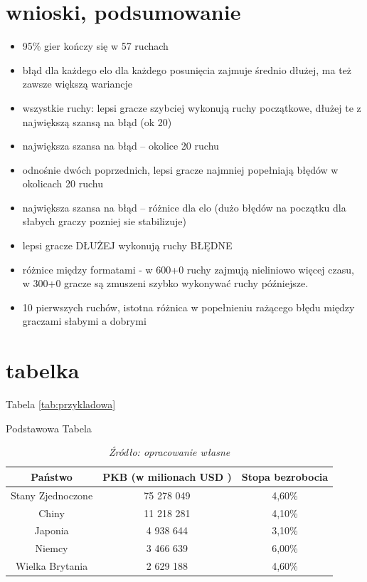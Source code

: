 \documentclass[inzynierska]{pwr_wmat_praca_dyplomowa}
\theoremstyle{plain}
\numberwithin{theorem}{chapter}
\theoremstyle{definition}
\numberwithin{theorem}{chapter}
\begin{document}
\chapter{wnioski, podsumowanie}
\begin{itemize}
	\item 95\% gier kończy się w 57 ruchach
	\item błąd dla każdego elo dla każdego posunięcia zajmuje średnio dłużej, ma też zawsze większą wariancje
	\item wszystkie ruchy: lepsi gracze szybciej wykonują ruchy początkowe, dłużej te z największą szansą na błąd (ok 20)
	\item największa szansa na błąd -- okolice 20 ruchu
	\item odnośnie dwóch poprzednich, lepsi gracze najmniej popełniają błędów w okolicach 20 ruchu
	\item największa szansa na błąd -- różnice dla elo (dużo błędów na początku 
	dla słabych graczy pozniej sie stabilizuje)
	\item lepsi gracze DŁUŻEJ wykonują ruchy BŁĘDNE
	\item różnice między formatami - w 600+0 ruchy zajmują nieliniowo więcej czasu, w 300+0 gracze są zmuszeni szybko wykonywać ruchy późniejsze.
	\item 10 pierwszych ruchów, istotna różnica w popełnieniu rażącego błędu między graczami słabymi a dobrymi
\end{itemize}


\chapter{tabelka}
Tabela \ref{tab:przykladowa} 
\begin{table}[H]
	\caption{Podstawowa Tabela}
	\centering
	\begin{tabular}{ccc}
		\hline
		\hline                       
		Państwo & PKB (w milionach USD )& Stopa bezrobocia  \\  [0.5ex] 
		\hline 
		Stany Zjednoczone & 75 278 049 & 4,60\%  \\
		Chiny & 11 218 281 & 4,10\%   \\
		Japonia & 4 938 644 & 3,10\%  \\
		Niemcy & 3 466 639 & 6,00\%   \\
		Wielka Brytania & 2 629 188 & 4,60\%  \\ [1ex]  
		\hline 
	\end{tabular}
	\caption*{\textit{Źródło: opracowanie własne}}
	\label{tab:przykladowa2} 
\end{table}
\end{document}
